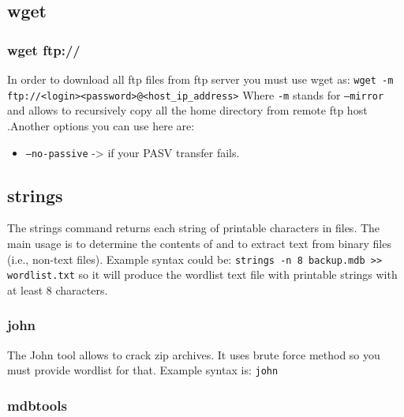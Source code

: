 \documentclass{article}[12pt]
\newcommand{\q}[1]{\texttt{#1}}
\begin{document}
\subsection{wget}
\subsubsection{wget ftp://}
In order to download all ftp files from ftp server you must use wget as: \newline \newline
\q{wget -m ftp://<login><password>@<host\_ip\_address>} \newline \newline
Where \q{-m} stands for \q{--mirror} and allows to recursively copy all the home directory from remote ftp host .Another options you can use here are:
\begin{itemize}
    \item \q{--no-passive} -> if your PASV transfer fails.
\end{itemize}
\subsection{strings}

The strings command returns each string of printable characters in files.
The main usage is to determine the contents of and to extract text from binary files (i.e., non-text files).
Example syntax could be: \newline
\q{strings -n 8 backup.mdb >> wordlist.txt}\newline
so it will produce the wordlist text file with printable strings with at least 8 characters.
\subsubsection{john}
\label{subsubsec:john}
The John tool allows to crack zip archives.
It uses brute force method so you must provide wordlist for that.
Example syntax is: \newline
\q{john }
\subsubsection{mdbtools}
\end{document}

